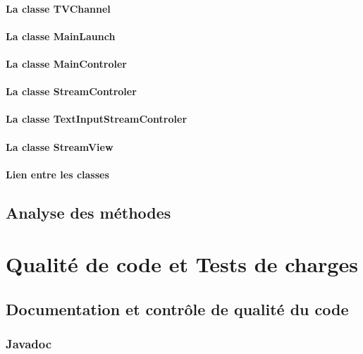 \documentclass{polytech/polytech}
\begin{document}
\subsection{La classe TVChannel}

\subsection{La classe MainLaunch}

\subsection{La classe MainControler}

\subsection{La classe StreamControler}

\subsection{La classe TextInputStreamControler}

\subsection{La classe StreamView}


\subsection{Lien entre les classes}


\chapter{Analyse des méthodes}



\part{Qualité de code et Tests de charges}


\chapter{Documentation et contrôle de qualité du code}


\section{Javadoc}
\end{document}
